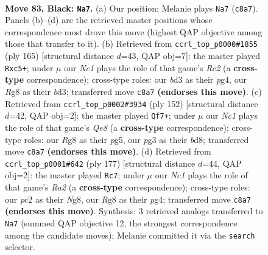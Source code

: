 \documentclass[11pt]{article}
\begin{document}
\clearpage

\begin{figure}[p]\centering
\begin{subfigure}{0.46\textwidth}\centering
\resizebox{\linewidth}{!}{%
\newchessgame
\chessboard[
  setfen={2n3r1/8/P2k4/8/3K4/2RB2PP/2P5/8 b - - 0 83},
  showmover=false,
  pgfstyle=straightmove, color=movearrow, markmove={c8-a7}
]}
\caption{}
\end{subfigure}\hfill
\begin{subfigure}{0.46\textwidth}\centering
\resizebox{\linewidth}{!}{%
\newchessgame
\chessboard[
  setfen={8/k1r2p2/P7/2R3K1/6P1/3B4/2P5/8 b - - 0 83},
  showmover=false,
  pgfstyle=straightmove, color=movearrow, markmove={c7-c5}
]}
\caption{}
\end{subfigure}
\\[4pt]
\begin{subfigure}{0.46\textwidth}\centering
\resizebox{\linewidth}{!}{%
\newchessgame
\chessboard[
  setfen={3bQ3/2k5/3r3p/6p1/4K1P1/8/8/8 w - - 10 77},
  showmover=false,
  pgfstyle=straightmove, color=movearrow, markmove={e8-f7}
]}
\caption{}
\end{subfigure}\hfill
\begin{subfigure}{0.46\textwidth}\centering
\resizebox{\linewidth}{!}{%
\newchessgame
\chessboard[
  setfen={6n1/r4k2/6Rp/8/6P1/5PK1/2B5/8 b - - 36 89},
  showmover=false,
  pgfstyle=straightmove, color=movearrow, markmove={a7-c7}
]}
\caption{}
\end{subfigure}
\caption{\textbf{Move 83, Black: \texttt{Na7}.} (a) Our position; Melanie plays \texttt{Na7} (\texttt{c8a7}). Panels (b)--(d) are the retrieved master positions whose correspondence most drove this move (highest QAP objective among those that transfer to it). (b) Retrieved from \texttt{ccrl\_top\_p0000\#1855} (ply 165) [structural distance $d$=43, QAP obj=7]: the master played \texttt{Rxc5+}; under $\mu$ our \emph{Nc1} plays the role of that game's \emph{Rc2} (a \textbf{cross-type} correspondence); cross-type roles: our \emph{b}d3 as their \emph{p}g4, our \emph{R}g8 as their \emph{b}d3; transferred move \texttt{c8a7} \textbf{(endorses this move)}. (c) Retrieved from \texttt{ccrl\_top\_p0002\#3934} (ply 152) [structural distance $d$=42, QAP obj=2]: the master played \texttt{Qf7+}; under $\mu$ our \emph{Nc1} plays the role of that game's \emph{Qe8} (a \textbf{cross-type} correspondence); cross-type roles: our \emph{R}g8 as their \emph{p}g5, our \emph{p}g3 as their \emph{b}d8; transferred move \texttt{c8a7} \textbf{(endorses this move)}. (d) Retrieved from \texttt{ccrl\_top\_p0001\#642} (ply 177) [structural distance $d$=44, QAP obj=2]: the master played \texttt{Rc7}; under $\mu$ our \emph{Nc1} plays the role of that game's \emph{Ra2} (a \textbf{cross-type} correspondence); cross-type roles: our \emph{p}c2 as their \emph{N}g8, our \emph{R}g8 as their \emph{p}g4; transferred move \texttt{c8a7} \textbf{(endorses this move)}. Synthesis: 3 retrieved analogs transferred to \texttt{Na7} (summed QAP objective 12, the strongest correspondence among the candidate moves); Melanie committed it via the \texttt{search} selector.}
\label{fig:thought-m165}
\end{figure}
\end{document}
